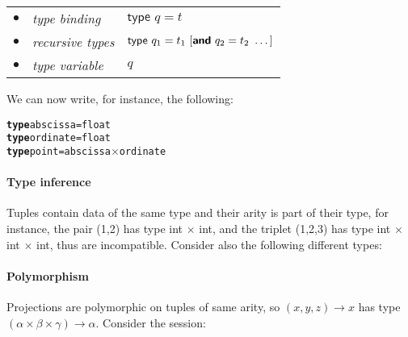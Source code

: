 \bigskip

\begin{tabular}{rll}
    $\bullet$
  & \emph{type binding}
  & \(\textsf{type} \,\, q = t\)\\
    $\bullet$
  & \emph{recursive types}
  & $\textsf{type} \,\, q_1 = t_1 \,\, \textrm{[}\textsf{\textbf{and}}
     \,\, q_2 = t_2 \,\, \ldots\textrm{]}$\\
    $\bullet$
  & \emph{type variable}
  & $q$
\end{tabular}

\bigskip

\noindent We can now write, for instance, the following:
\begin{alltt}
\textbf{type} abscissa = float
\textbf{type} ordinate = float
\textbf{type} point = abscissa \(\times\) ordinate
\end{alltt}

\paragraph{Type inference}

Tuples contain data of the same type and their arity is part of their
type, for instance, the pair \textsf{(1,2)} has type \textsf{int}
$\times$ \textsf{int}, and the triplet \textsf{(1,2,3)} has type
\textsf{int} $\times$ \textsf{int} $\times$ \textsf{int}, thus
are incompatible. Consider also the following different types:

\bigskip

\noindent{}

\noindent{}

\noindent{}

\noindent{}

\paragraph{Polymorphism}

Projections are polymorphic on tuples of same arity, so \Xfun $(x, y,
z) \rightarrow x$ has type $(\alpha \times \beta \times \gamma)
\rightarrow \alpha$. Consider the session:

\bigskip

\noindent{}

